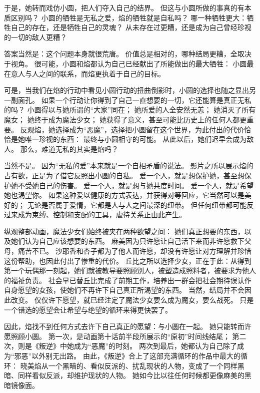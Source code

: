 于是，她转而戏仿小圆，把人们夺入自己的结界。
但这与小圆所做的事真的有本质区别吗？
小圆的牺牲是无私之爱，焰的牺牲就是自私吗？
哪一种牺牲更大：牺牲自己的存在，还是牺牲自己的灵魂？
从未存在过更糟，还是成为自己曾经珍视的一切的敌人更糟？

答案当然是：这个问题本身就很荒唐。
价值总是相对的，哪种结局更糟，全取决于视角。
很可能，小圆和焰都认为自己已经献出了所能做出的最大牺牲：
小圆最在意人与人之间的联系，而焰更执着于自己的目标。

可是，当我们在焰的行动中看见小圆行动的扭曲倒影时，小圆的选择也随之显出另一副面孔。
如果一个行动让你得到了自己一直想要的一切，它还能算是真正无私的吗？
小圆得以与她所谓的“大家”同在；
她所爱的人全安然无恙；
她消灭了所有魔女；
她终于成为魔法少女；
她获得了意义，甚至可能比历史上的任何人都更重要。
反观焰，她选择成为“恶魔”，选择把小圆留在这个世界，为此付出的代价恰恰是她唯一珍视的东西：
最终与小圆相守的可能。
从此以后，她们迟早会成为敌人。
那么，难道无私的其实是焰吗？

当然不是。
因为“无私的爱”本来就是一个自相矛盾的说法。
影片之所以展示焰的占有欲，正是为了借它反照出小圆的自私。
爱一个人，就是想保护她，甚至想保护她不受她自己的伤害。
爱一个人，就是想与她共度时间。
爱一个人，就是希望她也渴望你。
如果这种爱以健康的方式表达，并获得对等回应，它当然可以是美好的；
无论是否属于爱情，它都是人与人之间最深的纽带。
但任何纽带都可能反过来成为束缚、控制和支配的工具，虐待关系正由此产生。

纵观整部动画，魔法少女们始终被夹在两种欲望之间：
她们真正想要的东西，以及她们认为自己应该想要的东西。
麻美因为只许愿让自己活下来而非许愿救下父母，痛苦不已。
沙耶香和杏子都为了他人而许愿，却没有许愿让对方理解并珍惜这份帮助，也因此付出了惨重的代价。
丘比之所以选择少女，正在于此：从得到第一个玩偶那一刻起，她们就被教导要照顾别人，被塑造成照料者，被要求为他人的福祉负责\cite{fujimura-fanselow1991good-wives}。
社会早已替丘比完成了前期工作，培养出一群会把社会期待误认作自身愿望的女孩，使她们不再许下自己真正所渴望的东西。
当然，结局并不会因此改变。
仅仅许下愿望，就已经注定了魔法少女要么成为魔女，要么战死。
只是一个错选的愿望会让希望与绝望的循环来得更快罢了。

因此，焰找不到任何方式去许下自己真正的愿望：与小圆在一起。
她只能转而许愿照顾小圆。
第一次，是动画第十话前半段所展示的“原初”时间线结尾；
第二次，则是《叛逆》中她成为“恶魔”的时刻。
两次到最后，她都认为自己除了成为“邪恶”以外别无出路。
由此，《叛逆》合上了这部充满循环的作品中最大的循环：
晓美焰从一个黑暗的、看似反派的、扰乱现状的人物，变成了一个同样黑暗、同样看似反派，却维护现状的人物。
她如今比以往任何时候都更像麻美的黑暗镜像面。
